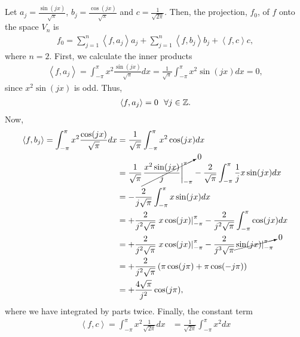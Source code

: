 \begin{questions}

\begin{solution}
Let $a_j=\frac{\sin(jx)}{\sqrt{\pi}}$, $b_j=\frac{\cos(jx)}{\sqrt{\pi}}$ and $c=\frac{1}{\sqrt{2\pi}}$. Then, the projection, $f_0$, of $f$ onto the space $V_n$ is
\begin{align*}
f_0=\sum_{j=1}^n\left<f,a_j\right>a_j+\sum_{j=1}^n\left<f,b_j\right>b_j+\left<f,c\right>c,
\end{align*}
where $n=2$. First, we calculate the inner products
\begin{align*}
\left<f,a_j\right>=\int_{-\pi}^{\pi}x^2\frac{\sin(jx)}{\sqrt{\pi}}dx=\frac{1}{\sqrt{\pi}}\int_{-\pi}^{\pi}x^2\sin(jx)dx=0,
\end{align*}
since $x^2\sin(jx)$ is odd. Thus,
\begin{align*}
\left<f,a_j\right>=0~~\forall j\in\mathbb{Z}.
\end{align*}
Now,
\begin{align*}
\left<f,b_j\right>=\int_{-\pi}^{\pi}x^2\frac{\cos(jx)}{\sqrt{\pi}}dx&=\frac{1}{\sqrt{\pi}}\int_{-\pi}^{\pi}x^2\cos(jx)dx\\
&=\frac{1}{\sqrt{\pi}}\cancelto{0}{\left.\frac{x^2\sin(jx)}{j}\right|_{-\pi}^{\pi}}-\frac{2}{\sqrt{\pi}}\int_{-\pi}^{\pi}\frac{1}{j} x\sin(jx)dx\\
&=-\frac{2}{j\sqrt{\pi}}\int_{-\pi}^{\pi}x\sin(jx)dx\\
&=+\frac{2}{j^2\sqrt{\pi}}\left.x\cos(jx)\right|_{-\pi}^{\pi}-\frac{2}{j^2\sqrt{\pi}}\int_{-\pi}^{\pi}\cos(jx)dx\\
&=+\frac{2}{j^2\sqrt{\pi}}\left.x\cos(jx)\right|_{-\pi}^{\pi}-\frac{2}{j^3\sqrt{\pi}}\cancelto{0}{\left.\sin(jx)\right|_{-\pi}^{\pi}}\\
&=+\frac{2}{j^2\sqrt{\pi}}\left(\pi\cos(j\pi)+\pi\cos(-j\pi)\right)\\
&=+\frac{4\sqrt{\pi}}{j^2}\cos(j\pi),
\end{align*}
where we have integrated by parts twice. Finally, the constant term
\begin{align*}
\left<f,c\right>=\int_{-\pi}^{\pi}x^2\frac{1}{\sqrt{2\pi}}dx&=\frac{1}{\sqrt{2\pi}}\int_{-\pi}^{\pi}x^2dx\\

\end{align*}
\end{solution}
\end{questions}
